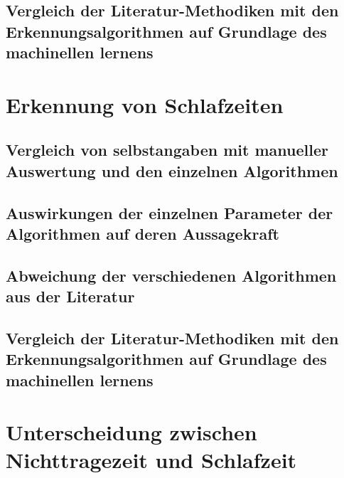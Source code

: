 \subsection{Vergleich der Literatur-Methodiken mit den Erkennungsalgorithmen auf Grundlage des machinellen lernens}


\section{Erkennung von Schlafzeiten}

\subsection{Vergleich von selbstangaben mit manueller Auswertung und den einzelnen Algorithmen}

\subsection{Auswirkungen der einzelnen Parameter der Algorithmen auf deren Aussagekraft}

\subsection{Abweichung der verschiedenen Algorithmen aus der Literatur}

\subsection{Vergleich der Literatur-Methodiken mit den Erkennungsalgorithmen auf Grundlage des machinellen lernens}



\section{Unterscheidung zwischen Nichttragezeit und Schlafzeit}
